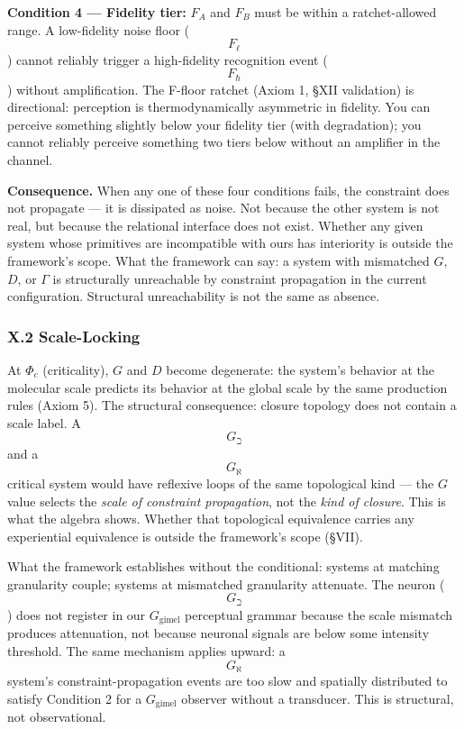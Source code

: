 \documentclass[12pt,a4paper]{article}
\begin{document}
\textbf{Condition 4 --- Fidelity tier:} $F_A$ and $F_B$ must be within a ratchet-allowed range. A low-fidelity noise floor ($$F_{\ell}$$) cannot reliably trigger a high-fidelity recognition event ($$F_{\hbar}$$) without amplification. The F-floor ratchet (Axiom 1, §XII validation) is directional: perception is thermodynamically asymmetric in fidelity. You can perceive something slightly below your fidelity tier (with degradation); you cannot reliably perceive something two tiers below without an amplifier in the channel.

\textbf{Consequence.} When any one of these four conditions fails, the constraint does not propagate --- it is dissipated as noise. Not because the other system is not real, but because the relational interface does not exist. Whether any given system whose primitives are incompatible with ours has interiority is outside the framework's scope. What the framework can say: a system with mismatched $G$, $D$, or $\Gamma$ is structurally unreachable by constraint propagation in the current configuration. Structural unreachability is not the same as absence.

\subsubsection{X.2 Scale-Locking}

At $\Phi_c$ (criticality), $G$ and $D$ become degenerate: the system's behavior at the molecular scale predicts its behavior at the global scale by the same production rules (Axiom 5). The structural consequence: closure topology does not contain a scale label. A $$G_{\beth}$$ and a $$G_{\aleph}$$ critical system would have reflexive loops of the same topological kind --- the $G$ value selects the \emph{scale of constraint propagation}, not the \emph{kind of closure}. This is what the algebra shows. Whether that topological equivalence carries any experiential equivalence is outside the framework's scope (§VII).

What the framework establishes without the conditional: systems at matching granularity couple; systems at mismatched granularity attenuate. The neuron ($$G_{\beth}$$) does not register in our $G_\text{gimel}$ perceptual grammar because the scale mismatch produces attenuation, not because neuronal signals are below some intensity threshold. The same mechanism applies upward: a $$G_{\aleph}$$ system's constraint-propagation events are too slow and spatially distributed to satisfy Condition 2 for a $G_\text{gimel}$ observer without a transducer. This is structural, not observational.
\end{document}
